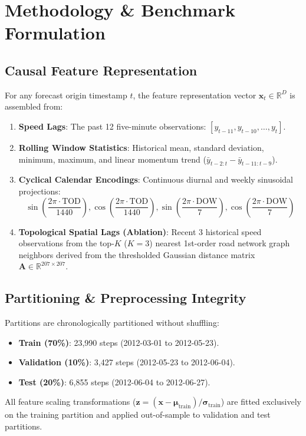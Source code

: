 \documentclass[conference]{IEEEtran}
\begin{document}
\section{Methodology \& Benchmark Formulation}

\subsection{Causal Feature Representation}
For any forecast origin timestamp $t$, the feature representation vector $\mathbf{x}_t \in \mathbb{R}^{D}$ is assembled from:
\begin{enumerate}
    \item \textbf{Speed Lags}: The past 12 five-minute observations: $[y_{t-11}, y_{t-10}, \dots, y_t]$.
    \item \textbf{Rolling Window Statistics}: Historical mean, standard deviation, minimum, maximum, and linear momentum trend ($\bar{y}_{t-2:t} - \bar{y}_{t-11:t-9}$).
    \item \textbf{Cyclical Calendar Encodings}: Continuous diurnal and weekly sinusoidal projections:
    \begin{equation}
        \sin\left(\frac{2\pi \cdot \text{TOD}}{1440}\right), \cos\left(\frac{2\pi \cdot \text{TOD}}{1440}\right), \sin\left(\frac{2\pi \cdot \text{DOW}}{7}\right), \cos\left(\frac{2\pi \cdot \text{DOW}}{7}\right)
    \end{equation}
    \item \textbf{Topological Spatial Lags (Ablation)}: Recent 3 historical speed observations from the top-$K$ ($K=3$) nearest 1st-order road network graph neighbors derived from the thresholded Gaussian distance matrix $\mathbf{A} \in \mathbb{R}^{207 \times 207}$.
\end{enumerate}

\subsection{Partitioning \& Preprocessing Integrity}
Partitions are chronologically partitioned without shuffling:
\begin{itemize}
    \item \textbf{Train (70\%)}: 23,990 steps (2012-03-01 to 2012-05-23).
    \item \textbf{Validation (10\%)}: 3,427 steps (2012-05-23 to 2012-06-04).
    \item \textbf{Test (20\%)}: 6,855 steps (2012-06-04 to 2012-06-27).
\end{itemize}
All feature scaling transformations ($\mathbf{z} = (\mathbf{x} - \boldsymbol{\mu}_{\text{train}}) / \boldsymbol{\sigma}_{\text{train}}$) are fitted exclusively on the training partition and applied out-of-sample to validation and test partitions.
\end{document}
